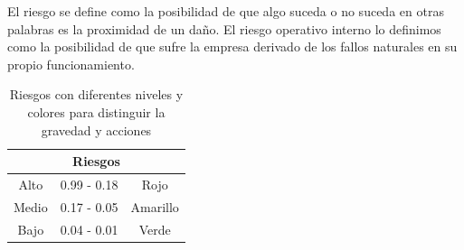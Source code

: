     El riesgo se define como la posibilidad de que algo suceda o no suceda en otras palabras es la proximidad de un daño. 
    El riesgo operativo interno lo definimos como la posibilidad de que sufre la empresa derivado de los fallos naturales en su propio funcionamiento.
    \begin{table}[h]
        \centering
        \caption{Riesgos con diferentes niveles y colores para distinguir la gravedad y acciones}
        \begin{tabular}{c c c}
        \hline
        \multicolumn{3}{c}{Riesgos}\\
        \hline
             Alto& 0.99 - 0.18 & Rojo  \\
        \hline
             Medio& 0.17 - 0.05 & Amarillo  \\
        \hline
             Bajo& 0.04 - 0.01 & Verde \\
        \hline     
        \end{tabular}
        \label{tab:riego}
    \end{table}
